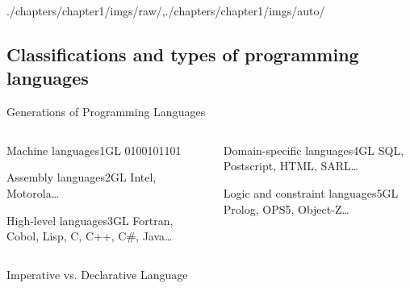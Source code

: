 \begin{graphicspathcontext}{{./chapters/chapter1/imgs/raw/},{./chapters/chapter1/imgs/auto/}}
\begin{bibunit}[apalike]

\subsection{Classifications and types of programming languages}
\subsectiontableofcontentslide

\begin{frame}{Generations of Programming Languages}
	\begin{columns}
		\begin{column}{.5\linewidth}
			\begin{rightanchorblock}{Machine languages}{1GL}
				0100101101
			\end{rightanchorblock}
			\vspace{0.5cm}
			\begin{rightanchorblock}{Assembly languages}{2GL}
				Intel, Motorola\dots
			\end{rightanchorblock}
			\vspace{0.5cm}
			\begin{rightanchorblock}{High-level languages}{3GL}
				Fortran, Cobol, Lisp, C, C++, C\#, Java\dots
			\end{rightanchorblock}
		\end{column}
		\begin{column}{.5\linewidth}
			\begin{leftanchorblock}{Domain-specific languages}{4GL}
				SQL, Postscript, HTML, SARL\dots
			\end{leftanchorblock}
			\vspace{0.5cm}
			\begin{leftanchorblock}{Logic and constraint languages}{5GL}
				Prolog, OPS5, Object-Z\dots
			\end{leftanchorblock}
		\end{column}
	\end{columns}
\end{frame}

\begin{frame}{Imperative vs. Declarative Language}
	\hfill
\end{frame}


\end{bibunit}
\end{graphicspathcontext}
